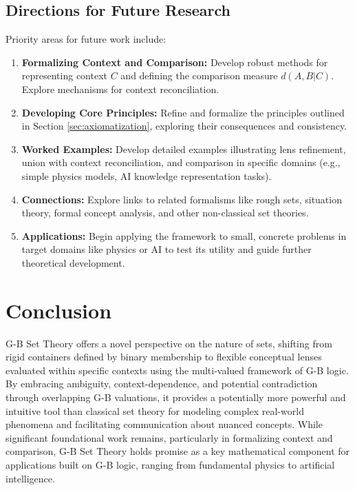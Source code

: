 \documentclass[11pt]{article}
\theoremstyle{definition}
\theoremstyle{plain}
\begin{document}
\subsection{Directions for Future Research}
Priority areas for future work include:
\begin{enumerate}
    \item \textbf{Formalizing Context and Comparison:} Develop robust methods for representing context $C$ and defining the comparison measure $d(A, B|C)$. Explore mechanisms for context reconciliation.
    \item \textbf{Developing Core Principles:} Refine and formalize the principles outlined in Section \ref{sec:axiomatization}, exploring their consequences and consistency.
    \item \textbf{Worked Examples:} Develop detailed examples illustrating lens refinement, union with context reconciliation, and comparison in specific domains (e.g., simple physics models, AI knowledge representation tasks).
    \item \textbf{Connections:} Explore links to related formalisms like rough sets, situation theory, formal concept analysis, and other non-classical set theories.
    \item \textbf{Applications:} Begin applying the framework to small, concrete problems in target domains like physics or AI to test its utility and guide further theoretical development.
\end{enumerate}

\section{Conclusion} \label{sec:conclusion}
G-B Set Theory offers a novel perspective on the nature of sets, shifting from rigid containers defined by binary membership to flexible conceptual lenses evaluated within specific contexts using the multi-valued framework of G-B logic. By embracing ambiguity, context-dependence, and potential contradiction through overlapping G-B valuations, it provides a potentially more powerful and intuitive tool than classical set theory for modeling complex real-world phenomena and facilitating communication about nuanced concepts. While significant foundational work remains, particularly in formalizing context and comparison, G-B Set Theory holds promise as a key mathematical component for applications built on G-B logic, ranging from fundamental physics to artificial intelligence.
\end{document}
